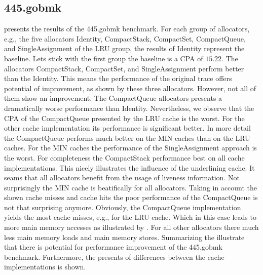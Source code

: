\documentclass[onecolumn, openright, master, english, signatures]{dbrgrptt}
\begin{document}
\subsection{445.gobmk}
 presents the results of the 445.gobmk benchmark. For each group of allocators, e.g., the five allocators Identity, CompactStack, CompactSet, CompactQueue, and SingleAssignment of the \ac{LRU} group, the results of Identity represent the baseline. Lets stick with the first group the baseline is a CPA of $15.22$. The allocators CompactStack, CompactSet, and SingleAssignment perform better than the Identity. This means the performance of the original \ac{trace} offers potential of improvement, as shown by these three allocators. However, not all of them show an improvement. The CompactQueue allocators presents a dramatically worse performance than Identity. Nevertheless, we observe that the \ac{CPA} of the CompactQueue presented by the \ac{LRU} cache is the worst. For the other cache implementation its performance is significant better. In more detail the CompactQueue performs much better on the MIN caches than on the \ac{LRU} caches. For the MIN caches the performance of the SingleAssignment approach is the worst. For completeness the CompactStack performance best on all cache implementations. This nicely illustrates the influence of the underlining cache. It seams that all allocators benefit from the usage of liveness information. Not surprisingly the MIN cache is beatifically for all allocators.
Taking in account the shown cache misses and cache hits the poor performance of the CompactQueue is not that surprising anymore. Obviously, the CompactQueue implementation yields the most cache misses, e.g., for the \ac{LRU} cache. Which in this case leads to more main memory accesses as illustrated by . For all other allocators there much less main memory loads and main memory stores.
Summarizing the  illustrate that there is potential for performance improvement of the 445.gobmk benchmark. Furthermore, the presents of differences between the cache implementations is shown.
\end{document}
